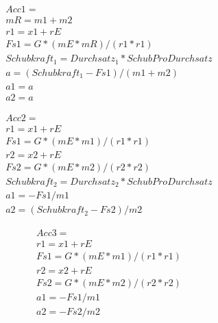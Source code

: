 \documentclass[10pt,a4paper]{article}
\begin{document}
 	 	\begin{align}
 	 	Acc1 = 
 	 	\\mR = m1 + m2 \nonumber
 	 	\\r1 = x1 + rE \nonumber
 	 	\\Fs1 = G * (mE * mR) / (r1*r1) \nonumber
 	 	\\Schubkraft_1 = Durchsatz_1 * SchubProDurchsatz \nonumber
 	 	\\a = (Schubkraft_1 - Fs1) / (m1+m2) \nonumber
 	 	\\a1 = a \nonumber
 	 	\\a2 = a \nonumber
 	 	\end{align}
 	 	
 	 	\begin{align}
 	 	Acc2 =	 	 
 	 	\\r1 = x1 + rE \nonumber
 	 	\\Fs1 = G * (mE * m1) / (r1*r1) \nonumber
 	 	\\r2 = x2 + rE \nonumber
 	 	\\Fs2 = G * (mE * m2) / (r2*r2) \nonumber
 	 	\\Schubkraft_2 = Durchsatz_2 * SchubProDurchsatz \nonumber
 	 	\\a1 = - Fs1 / m1 \nonumber
 	 	\\a2 = (Schubkraft_2- Fs2) / m2 \nonumber
 	 	\end{align}

\begin{align}
Acc3 =
\\r1 = x1 + rE \nonumber
\\Fs1 = G * (mE * m1) / (r1*r1) \nonumber
\\r2 = x2 + rE \nonumber
\\Fs2 = G * (mE * m2) / (r2*r2) \nonumber
\\a1 = - Fs1 / m1 \nonumber
\\a2 = - Fs2 / m2 \nonumber
\end{align}
\end{document}
